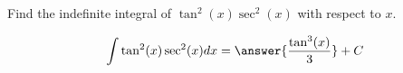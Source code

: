 \documentclass{ximera}
\author{Gregory Hartman \and Matthew Carr\and Nela Lakos}
\begin{document}
\begin{exercise}

Find the indefinite integral of $ \tan ^2(x) \sec ^2(x)$ with respect to $x$.

\[
\int \tan ^2(x) \sec ^2(x) dx=\answer{\frac{\tan ^3(x)}{3}}+C
\]

\end{exercise}
\end{document}
